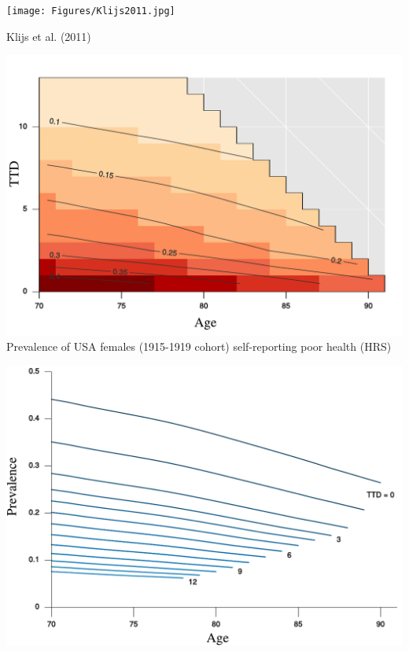 \documentclass[20pt]{beamer}
\begin{document}
\begin{frame}[plain]
\begin{center}
\texttt{[image: Figures/Klijs2011.jpg]}
\end{center}
Klijs et al. (2011)
\end{frame}

\begin{frame}[plain]
\begin{center}
\includegraphics[scale=1.2]{Figures/srhpoor_f_Surf_a.pdf}
\\
\normalsize Prevalence of USA
females (1915-1919 cohort) self-reporting poor health (HRS)
\end{center}
\end{frame}

\begin{frame}[plain]
\begin{center}
\includegraphics[scale=1.2]{Figures/srhpoor_f_Age_c.pdf}
\end{center}
\end{frame}
\end{document}
